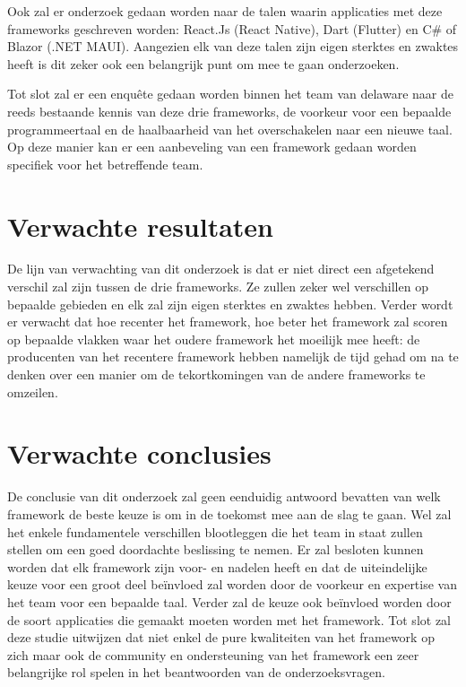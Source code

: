 Ook zal er onderzoek gedaan worden naar de talen waarin applicaties met deze frameworks geschreven worden: React.Js (React Native), Dart (Flutter) en C\# of Blazor (.NET MAUI). Aangezien elk van deze talen zijn eigen sterktes en zwaktes heeft is dit zeker ook een belangrijk punt om mee te gaan onderzoeken. 

Tot slot zal er een enquête gedaan worden binnen het team van delaware naar de reeds bestaande kennis van deze drie frameworks, de voorkeur voor een bepaalde programmeertaal en de haalbaarheid van het overschakelen naar een nieuwe taal. Op deze manier kan er een aanbeveling van een framework gedaan worden specifiek voor het betreffende team.


\section{Verwachte resultaten}
\label{sec:verwachte_resultaten}

De lijn van verwachting van dit onderzoek is dat er niet direct een afgetekend verschil zal zijn tussen de drie frameworks. Ze zullen zeker wel verschillen op bepaalde gebieden en elk zal zijn eigen sterktes en zwaktes hebben. Verder wordt er verwacht dat hoe recenter het framework, hoe beter het framework zal scoren op bepaalde vlakken waar het oudere framework het moeilijk mee heeft: de producenten van het recentere framework hebben namelijk de tijd gehad om na te denken over een manier om de tekortkomingen van de andere frameworks te omzeilen.

\section{Verwachte conclusies}
\label{sec:verwachte_conclusies}

De conclusie van dit onderzoek zal geen eenduidig antwoord bevatten van welk framework de beste keuze is om in de toekomst mee aan de slag te gaan. Wel zal het enkele fundamentele verschillen blootleggen die het team in staat zullen stellen om een goed doordachte beslissing te nemen. Er zal besloten kunnen worden dat elk framework zijn voor- en nadelen heeft en dat de uiteindelijke keuze voor een groot deel beïnvloed zal worden door de voorkeur en expertise van het team voor een bepaalde taal. Verder zal de keuze ook beïnvloed worden door de soort applicaties die gemaakt moeten worden met het framework. Tot slot zal deze studie uitwijzen dat niet enkel de pure kwaliteiten van het framework op zich maar ook de community en ondersteuning van het framework een zeer belangrijke rol spelen in het beantwoorden van de onderzoeksvragen.

